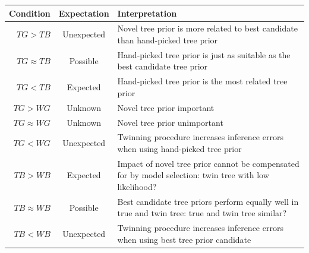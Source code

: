 \documentclass{article}
\begin{document}
\begin{table}
  \begin{tabular}{ | r | c | p{9cm} | }
    \hline
    \textbf{Condition} & \textbf{Expectation} & \textbf{Interpretation} \\ 
    \hline
    \textbf{$TG > TB$}       & Unexpected & Novel tree prior is more related to 
      best candidate than hand-picked tree prior \\
    \textbf{$TG \approx TB$} & Possible   & Hand-picked tree prior is just as 
      suitable as the best candidate tree prior \\
    \textbf{$TG < TB$}       & Expected   & Hand-picked tree prior is the most 
      related tree prior \\
    \hline
    \textbf{$TG > WG$}       & Unknown    & Novel tree prior important \\
    \textbf{$TG \approx WG$} & Unknown    & Novel tree prior unimportant \\
    \textbf{$TG < WG$}       & Unexpected & Twinning procedure increases 
      inference errors when using hand-picked tree prior \\
    \hline
    \textbf{$TB > WB$}       & Expected   & Impact of novel tree prior cannot 
      be compensated for by model selection: twin tree with low likelihood? \\
    \textbf{$TB \approx WB$} & Possible   & Best candidate tree priors perform 
      equally well in true and twin tree: true and twin tree similar? \\
    \textbf{$TB < WB$}       & Unexpected & Twinning procedure increases 
      inference errors  when using best tree prior candidate \\

\end{tabular}
\end{table}
\end{document}
